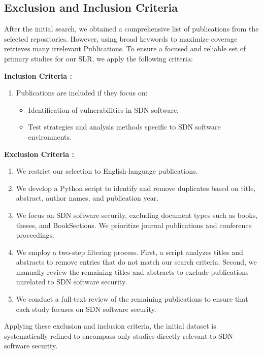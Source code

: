 \subsection{Exclusion and Inclusion Criteria}
After the initial search, we obtained a comprehensive list of publications from the selected repositories. However, using broad keywords to maximize coverage retrieves many irrelevant Publications. To ensure a focused and reliable set of primary studies for our SLR, we apply the following criteria:
\begin{description} 
\item \textbf{Inclusion Criteria :}
\begin{enumerate}
    \item Publications are included if they focus on:
    \begin{itemize}
        \item Identification of vulnerabilities in SDN software.
        \item Test strategies and analysis methods specific to SDN software environments.
    \end{itemize}
\end{enumerate}
\item \textbf{Exclusion Criteria :}
\begin{enumerate}[start=2]
    \item We restrict our selection to English-language publications.
    \item We develop a Python script to identify and remove duplicates based on title, abstract, author names, and publication year. 
    \item We focus on SDN software security, excluding document types such as books, theses, and BookSections. We prioritize journal publications and conference proceedings.
    \item We employ a two-step filtering process. First, a script analyzes titles and abstracts to remove entries that do not match our search criteria. Second, we manually review the remaining titles and abstracts to exclude publications unrelated to SDN software security.
    \item We conduct a full-text review of the remaining publications to ensure that each study focuses on SDN software security.
\end{enumerate}
\end{description} 
Applying these exclusion and inclusion criteria, the initial dataset is systematically refined to encompass only studies directly relevant to SDN software security.
